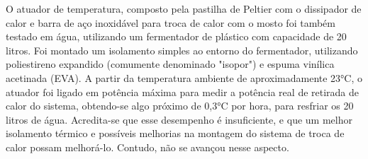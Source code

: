 O atuador de temperatura, composto pela pastilha de Peltier com o dissipador de calor e barra de aço inoxidável para troca de
calor com o mosto foi também testado em água, utilizando um fermentador de plástico com capacidade de 20 litros. Foi montado
um isolamento simples ao entorno do fermentador, utilizando poliestireno expandido (comumente denominado "isopor") e espuma
vinílica acetinada (EVA). A partir da temperatura ambiente de aproximadamente 23°C, o atuador foi ligado em potência máxima
para medir a potência real de retirada de calor do sistema, obtendo-se algo próximo de 0,3°C por hora, para resfriar os 20 litros
de água. Acredita-se que esse desempenho é insuficiente, e que um melhor isolamento térmico e possíveis melhorias na montagem
do sistema de troca de calor possam melhorá-lo. Contudo, não se avançou nesse aspecto.



